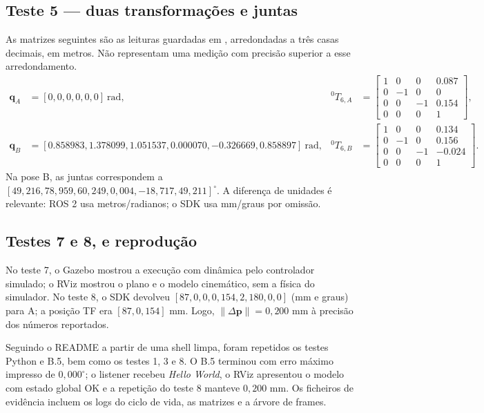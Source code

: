 \subsection{Teste 5 — duas transformações e juntas}
As matrizes seguintes são as leituras  guardadas em , arredondadas a três casas decimais, em metros. Não representam uma medição com precisão superior a esse arredondamento.
\begin{align*}
\mathbf q_A&=[0,0,0,0,0,0]\ \mathrm{rad},&
{}^0T_{6,A}&=\begin{bmatrix}1&0&0&0.087\\0&-1&0&0\\0&0&-1&0.154\\0&0&0&1\end{bmatrix},\\[1mm]
\mathbf q_B&=[0.858983,1.378099,1.051537,0.000070,-0.326669,0.858897]\ \mathrm{rad},&
{}^0T_{6,B}&=\begin{bmatrix}1&0&0&0.134\\0&-1&0&0.156\\0&0&-1&-0.024\\0&0&0&1\end{bmatrix}.
\end{align*}
Na pose B, as juntas correspondem a $[49{,}216,78{,}959,60{,}249,0{,}004,-18{,}717,49{,}211]^\circ$. A diferença de unidades é relevante: ROS 2 usa metros/radianos; o SDK usa mm/graus por omissão.

\subsection{Testes 7 e 8, e reprodução}
No teste 7, o Gazebo mostrou a execução com dinâmica pelo controlador simulado; o RViz mostrou o plano e o modelo cinemático, sem a física do simulador. No teste 8, o SDK devolveu $[87{,}0,0{,}0,154{,}2,180,0,0]$ (mm e graus) para A; a posição TF era $[87,0,154]$ mm. Logo, $\|\Delta\mathbf p\|=0{,}200$ mm à precisão dos números reportados.

Seguindo o README a partir de uma shell limpa, foram repetidos os testes Python e B.5, bem como os testes 1, 3 e 8. O B.5 terminou com erro máximo impresso de $0{,}000^\circ$; o listener recebeu \emph{Hello World}, o RViz apresentou o modelo com estado global OK e a repetição do teste 8 manteve $0{,}200$ mm. Os ficheiros de evidência incluem os logs do ciclo de vida, as matrizes e a árvore de frames.

